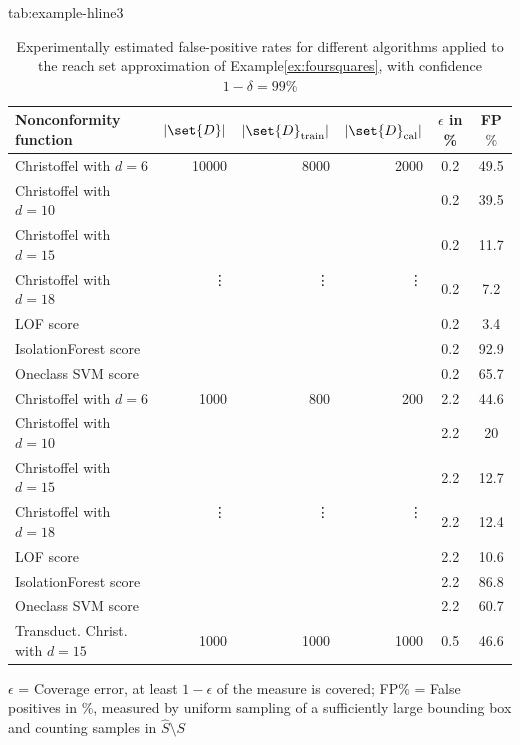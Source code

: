 \documentclass[pmlr]{jmlr}%
\newcommand\mc{\multicolumn{1}{c}}
\begin{document}
\begin{table}[tbp]
\floatconts
  {tab:example-hline3}
  {\caption{\label{tab:table3}Experimentally estimated false-positive rates for different algorithms applied to the reach set approximation of Example\;\ref{ex:foursquares}, with confidence $1-\delta=99\%$}}%
  {\small
\begin{tabular}{@{}lrrrSS@{}}
\toprule
Nonconformity function  & $|\set{D}|$ & $|\set{D}_\mathrm{train}|$ & $|\set{D}_\mathrm{cal}|$ & \mc{$\epsilon$ in \%} & \mc{FP$\%$} \\
\midrule
Christoffel with $d=6$& 10000 & 8000 & 2000 & 0.2 & 49.5\\
Christoffel with $d=10$&  &  &  & 0.2 & 39.5\\
Christoffel with $d=15$&   &  &  & 0.2 & 11.7\\
Christoffel with $d=18$&   &  &  & 0.2 & 7.2\\
LOF score &  &  &  & 0.2 & 3.4 \\
IsolationForest score &  &  &  & 0.2 & 92.9 \\
Oneclass SVM score &  &  &  & 0.2 & 65.7 \\
Christoffel with $d=6$& 1000 & 800 & 200 & 2.2 & 44.6\\
Christoffel with $d=10$&  &  &  & 2.2 & 20\\
Christoffel with $d=15$&  &  &  & 2.2 & 12.7\\
Christoffel with $d=18$&  &  &  & 2.2 & 12.4\\
LOF score &  &  &  & 2.2 & 10.6 \\
IsolationForest score &  &  &  & 2.2 & 86.8 \\
Oneclass SVM score &  &  &  & 2.2 & 60.7 \\
Transduct. Christ. with $d=15$ & 1000 & 1000 & 1000 & 0.5 & 46.6\\
\bottomrule
\end{tabular}
\vspace{1ex}

{ \footnotesize{\raggedright 
$\epsilon$ = Coverage error, at least $1-\epsilon$ of the measure is covered; 
FP$\%$ = False positives in \%, measured by uniform sampling of a sufficiently large bounding box and counting samples in $\hat S \setminus S$}}
  }
\end{table}
\end{document}

